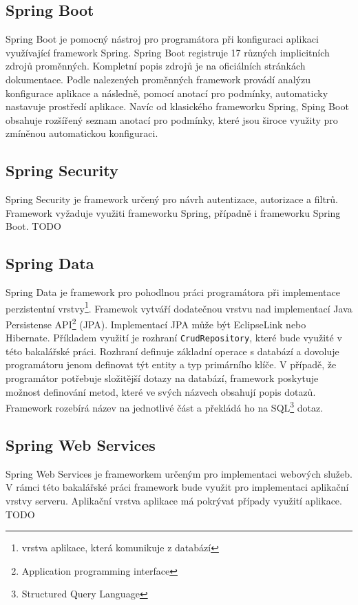     \subsection{Spring Boot}
        \cite{spring-boot}
        Spring Boot je pomocný nástroj pro programátora při konfiguraci aplikaci využívající framework Spring. Spring Boot registruje 17 různých implicitních zdrojů proměnných. Kompletní popis zdrojů je na oficiálních stránkách dokumentace\cite{spring-property-sources}. Podle nalezených proměnných framework provádí analýzu konfigurace aplikace a následně, pomocí anotací pro podmínky, automaticky nastavuje prostředí aplikace. Navíc od klasického frameworku Spring, Sping Boot obsahuje rozšířený seznam anotací pro podmínky, které jsou široce využity pro zmíněnou automatickou konfiguraci.
    
    \subsection{Spring Security}
        \cite{spring-security}
        Spring Security je framework určený pro návrh autentizace, autorizace a filtrů. Framework vyžaduje využiti frameworku Spring, případně i frameworku Spring Boot. TODO
    
    \subsection{Spring Data}
        Spring Data je framework pro pohodlnou práci programátora při implementace perzistentní vrstvy\footnote{vrstva aplikace, která komunikuje z databází}. Framewok vytváří dodatečnou vrstvu nad implementací Java Persistense API\footnote{Application programming interface} (JPA). Implementací JPA může být EclipseLink nebo Hibernate. Příkladem využití je rozhraní \texttt{CrudRepository}, které bude využité v této bakalářské práci. Rozhraní definuje základní operace s databází a dovoluje programátoru jenom definovat týt entity a typ primárního klíče. V případě, že programátor potřebuje složitější dotazy na databází, framework poskytuje možnost definování metod, které ve svých názvech obsahují popis dotazů. Framework rozebírá název na jednotlivé část a překládá ho na SQL\footnote{Structured Query Language} dotaz.
    
    \subsection{Spring Web Services}
        \cite{spring-web-services}
        Spring Web Services je frameworkem určeným pro implementaci webových služeb. V rámci této bakalářské práci framework bude využit pro implementaci aplikační vrstvy serveru. Aplikační vrstva aplikace má pokrývat případy využití aplikace. TODO
        

